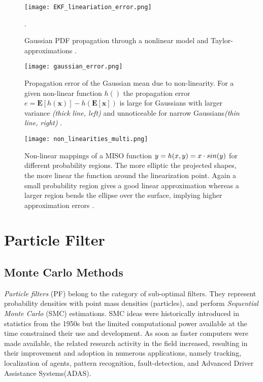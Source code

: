 \begin{figure}[H]
	\centering
	\texttt{[image: EKF\_lineariation\_error.png]}
	\caption{Gaussian PDF propagation through a nonlinear model and Taylor-approximations \cite{Thrun2005}.}.
	\label{fig:taylor_approximation}
\end{figure}


\begin{figure}[H]
	\centering
	\texttt{[image: gaussian\_error.png]}
	
	\caption{Propagation error  of the Gaussian mean due to non-linearity. For a given non-linear function $h()$ the propagation error $e=\mathbf{E}[h(\mathbf{x})]-h(\mathbf{E}[\mathbf{x}])$ is large for Gaussians with larger variance \textit{(thick line, left)} and unnoticeable for narrow Gaussians\textit{(thin line, right)} \cite{Sola2011}.}
		
	\label{fig:taylor_approximation2}
\end{figure}


\begin{figure}[H]
	\centering
	\texttt{[image: non\_linearities\_multi.png]}
	\caption{Non-linear mappings of a MISO function ${{y}}=h(x,y) = x \cdot sin(y)$ for different probability regions. The more elliptic the projected shapes, the more linear the function around the linearization point. Again a small probability region gives a good linear approximation whereas a larger region bends the ellipse over the surface, implying higher approximation errors \cite{Sola2011}.}
	\label{fig:nonlinearitiesmulti}
\end{figure}

\section{Particle Filter}
\subsection{Monte Carlo Methods}
\emph{Particle filters} (PF) belong to the category of sub-optimal filters. They represent probability densities with point mass densities (particles), and perform \emph{Sequential Monte Carlo} (SMC) estimations. SMC ideas were historically introduced in statistics from the 1950s but the limited computational power available at the time constrained their use and development. As soon as faster computers were made available, the related research activity in the field increased, resulting in their improvement and adoption in numerous applications, namely tracking, localization of agents, pattern recognition, fault-detection, and Advanced Driver Assistance Systems(ADAS). 

